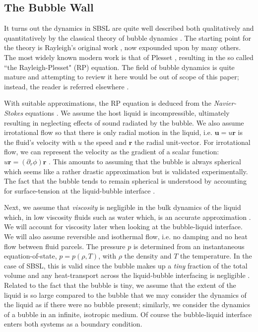 \documentclass[11pt,prb,aps,nofootinbib,superscriptaddress,floatfix]{revtex4-2}
\begin{document}
\subsection{The Bubble Wall}
It turns out the dynamics in SBSL are quite well described both qualitatively and quantitatively by the classical theory of bubble dynamics \cite{prosperetti1999old,brenner2002single,prosperetti1986bubble,plesset1977bubble,suslick2008inside,yasui2018acoustic,brennen2014cavitation}. The starting point for the theory is Rayleigh's original work \cite{rayleigh1917pressure}, now expounded upon by many others. The most widely known modern work is that of Plesset \cite{plesset1977bubble,plesset1949dynamics,prosperetti1986bubble}, resulting in the so called ``the Rayleigh-Plesset" (RP) equation. The field of bubble dynamics is quite mature and attempting to review it here would be out of scope of this paper; instead, the reader is referred elsewhere \cite{prosperetti1999old,brenner2002single,yasui2018acoustic,prosperetti1986bubble}. 

With suitable approximations, the RP equation is deduced from the \emph{Navier-Stokes} equations \cite{prosperetti1999old,brenner2002single,prosperetti1986bubble,plesset1977bubble,suslick2008inside,yasui2018acoustic}. We assume the host liquid is incompressible, ultimately resulting in neglecting effects of sound radiated by the bubble. We also assume irrotational flow so that there is only radial motion in the liquid, i.e. $\bm{u}=u\bm{r}$ is the fluid's velocity with $u$ the speed and $\bm{r}$ the radial unit-vector. For irrotational flow, we can represent the velocity as the gradient of a scalar function: $u\bm{r}=(\partial_r \phi) \bm{r}$ \cite{jackson1999classical}. This amounts to assuming that the bubble is always spherical which seems like a rather drastic approximation but is validated experimentally. The fact that the bubble tends to remain spherical is understood by accounting for surface-tension at the liquid-bubble interface \cite{prosperetti1999old}.

Next, we assume that \emph{viscosity} is negligible in the bulk dynamics of the liquid which, in low viscosity fluids such as water which, is an accurate approximation \cite{prosperetti1986bubble,prosperetti1999old,brenner2002single,plesset1977bubble}. We will account for viscosity later when looking at the bubble-liquid interface. We will also assume reversible and isothermal flow, i.e. no damping and no heat flow between fluid parcels. The pressure $p$ is determined from an instantaneous equation-of-state, $p=p(\rho,T)$, with $\rho$ the density and $T$ the temperature. In the case of SBSL, this is valid since the bubble makes up a \emph{tiny} fraction of the total volume and any heat-transport across the liquid-bubble interfacing is negligible \cite{prosperetti1999old}. Related to the fact that the bubble is tiny, we assume that the extent of the liquid is so large compared to the bubble that we may consider the dynamics of the liquid as if there were no bubble present; similarly, we consider the dynamics of a bubble in an infinite, isotropic medium. Of course the bubble-liquid interface enters both systems as a boundary condition.
\end{document}

